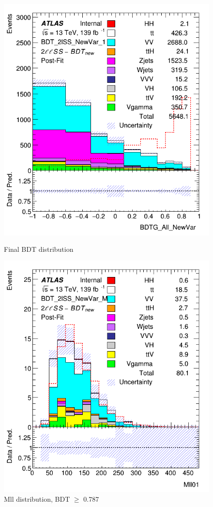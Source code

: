 \begin{figure}[!h]
\begin{minipage}[c]{.5\linewidth}
  \centering
  \includegraphics[width=\textwidth]{figures/2LSS/HH_l20tau_NewDef2.png}
  \caption{Final BDT distribution}
  \label{fig:BDT}
\end{minipage}
\begin{minipage}[c]{.5\linewidth}
    \centering
    \includegraphics[width=\textwidth]{figures/2LSS/HH_l20tau_NewDef_postFit.png}
    \caption{Mll distribution, BDT $\geq$ 0.787}
    \label{fig:Mll_BDT}
\end{minipage}
\end{figure}
